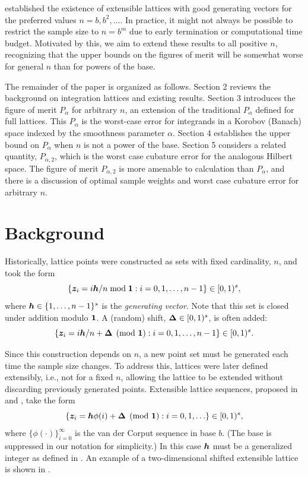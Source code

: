 \documentclass[authoryear]{elsarticle}
\begin{document}
\cite{HicNie03a} established the existence of extensible lattices with good generating vectors for the preferred values $n = b, b^2, \ldots$. 
In practice, it might not always be possible to restrict the sample size to $n = b^m$ due to early termination or computational time budget. Motivated by this, we aim to extend these results to all positive $n$, recognizing that the upper bounds on the figures of merit will be somewhat worse for general $n$ than for powers of the base.

The remainder of the paper is organized as follows. Section 2 reviews the background on integration lattices and existing results. Section 3 introduces the figure of merit $P_\alpha$ for arbitrary $n$, an extension of the traditional $P_\alpha$ defined for full lattices.  This $P_\alpha$ is the worst-case error for integrands in a Korobov (Banach) space indexed by the smoothness parameter $\alpha$.  Section 4 establishes the upper bound on $P_\alpha$ when $n$ is not a power of the base. Section 5 considers a related quantity, $P_{\alpha,2}$, which is the worst case cubature error for the analogous Hilbert space.  The figure of merit $P_{\alpha,2}$ is more amenable to calculation than $P_\alpha$, and there is a discussion of optimal sample weights and worst case cubature error for arbitrary $n$.


\section{Background} %
Historically, lattice points were constructed as sets with fixed cardinality, $n$, and took the form
\begin{equation*} %
    \{\vz_i = i \vh/n \bmod{\vone} : i=0,1, \ldots, n-1 \} \in [0,1)^s,
\end{equation*}
where $\boldsymbol{h} \in \{1, \ldots, n-1\}^s$ is the \emph{generating vector}. Note that this set is closed under addition modulo $\boldsymbol{1}$. A (random) shift, $\boldsymbol{\Delta} \in [0,1)^s$, is often added:
\begin{equation*}%
    \{\vz_i = i \vh/n + \vDelta \pmod{\vone} : i=0,1, \ldots, n-1 \} \in [0,1)^s.
\end{equation*}

Since this construction depends on $n$, a new point set must be generated each time the sample size changes. To address this, lattices were later defined extensibly, i.e., not for a fixed $n$, allowing the lattice to be extended without discarding previously generated points. Extensible lattice sequences, proposed in \cite{Mai81a} and \cite{HicEtal00}, take the form 
\begin{equation*} \label{eq:extlat}
    \{\boldsymbol{z}_i = \boldsymbol{h}\phi(i)+ \boldsymbol{\Delta} \pmod{\boldsymbol{1}} : i=0,1, \ldots \} \in [0,1)^s,
\end{equation*}
where $\{\phi(\cdot)\}_{i=0}^\infty$ is the van der Corput sequence in base $b$.  (The base is suppressed in our notation for simplicity.) In this case $\boldsymbol{h}$ must be a generalized integer as defined in \cite[Section 2]{HicNie03a}. An example of a two-dimensional shifted extensible lattice is shown in . 
\end{document}
